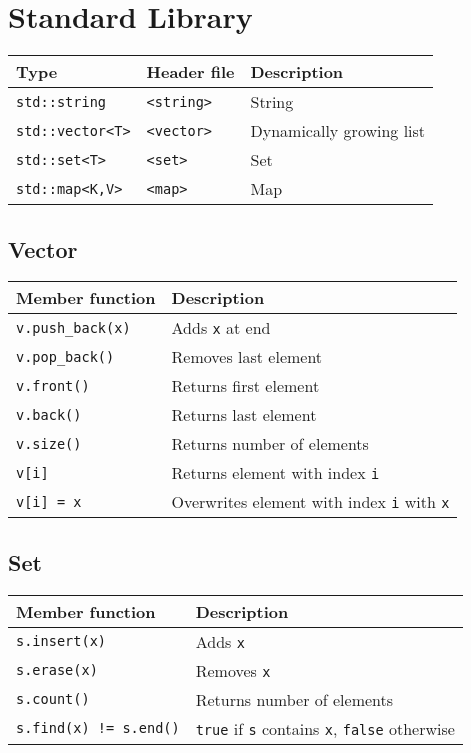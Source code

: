 \section{Standard Library}

\begin{center}
  \begin{tabular}{lll}
    \textbf{Type} & \textbf{Header file} & \textbf{Description} \\
    \toprule
    \verb'std::string' & \tt <string> & String \\
    \verb'std::vector<T>' & \tt <vector> & Dynamically growing list \\
    \verb'std::set<T>' & \tt <set> & Set \\
    \verb'std::map<K,V>' & \tt <map> & Map \\
  \end{tabular}
\end{center}

\subsection{Vector}

\begin{center}
  \begin{tabular}{ll}
    \textbf{Member function} & \textbf{Description} \\
    \toprule
    \verb'v.push_back(x)' & Adds \verb'x' at end \\
    \verb'v.pop_back()' & Removes last element \\
    \verb'v.front()' & Returns first element \\
    \verb'v.back()' & Returns last element \\
    \verb'v.size()' & Returns number of elements \\
    \verb'v[i]' & Returns element with index \verb'i' \\
    \verb'v[i] = x' & Overwrites element with index \verb'i' with \verb'x' \\
  \end{tabular}
\end{center}

\subsection{Set}

\begin{center}
  \begin{tabular}{ll}
    \textbf{Member function} & \textbf{Description} \\
    \toprule
    \verb's.insert(x)' & Adds \verb'x' \\
    \verb's.erase(x)' & Removes \verb'x' \\
    \verb's.count()' & Returns number of elements \\
    \verb's.find(x) != s.end()' & \verb'true' if \verb's' contains \verb'x', \verb'false' otherwise \\
  \end{tabular}
\end{center}

